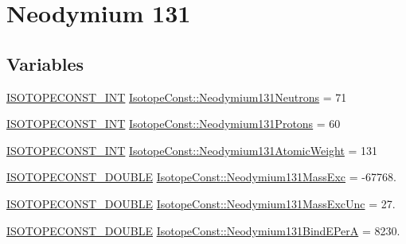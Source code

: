 \hypertarget{group___isotope_const-_neodymium-_nd131}{}\section{Neodymium 131}
\label{group___isotope_const-_neodymium-_nd131}
\subsection*{Variables}
\begin{DoxyCompactItemize}
\item 
\mbox{\hyperlink{group___isotope_const-_macros_ga5f18360b3e99483a35c32d789e62621c}{I\+S\+O\+T\+O\+P\+E\+C\+O\+N\+S\+T\+\_\+\+I\+NT}} \mbox{\hyperlink{group___isotope_const-_neodymium-_nd131_ga7b2fcf7b9120a60a3ad6dd3814edc49d}{Isotope\+Const\+::\+Neodymium131\+Neutrons}} = 71
\item 
\mbox{\hyperlink{group___isotope_const-_macros_ga5f18360b3e99483a35c32d789e62621c}{I\+S\+O\+T\+O\+P\+E\+C\+O\+N\+S\+T\+\_\+\+I\+NT}} \mbox{\hyperlink{group___isotope_const-_neodymium-_nd131_ga1cd483fe2c53ac8040c6fde64a414961}{Isotope\+Const\+::\+Neodymium131\+Protons}} = 60
\item 
\mbox{\hyperlink{group___isotope_const-_macros_ga5f18360b3e99483a35c32d789e62621c}{I\+S\+O\+T\+O\+P\+E\+C\+O\+N\+S\+T\+\_\+\+I\+NT}} \mbox{\hyperlink{group___isotope_const-_neodymium-_nd131_ga61a57539ca4e4c3df9f56d10b41f3926}{Isotope\+Const\+::\+Neodymium131\+Atomic\+Weight}} = 131
\item 
\mbox{\hyperlink{group___isotope_const-_macros_ga8f45a7272ce02c0b4c65c44636ed719a}{I\+S\+O\+T\+O\+P\+E\+C\+O\+N\+S\+T\+\_\+\+D\+O\+U\+B\+LE}} \mbox{\hyperlink{group___isotope_const-_neodymium-_nd131_ga8f1b6b9ac8f3beae7e555125c6402ec9}{Isotope\+Const\+::\+Neodymium131\+Mass\+Exc}} = -\/67768.
\item 
\mbox{\hyperlink{group___isotope_const-_macros_ga8f45a7272ce02c0b4c65c44636ed719a}{I\+S\+O\+T\+O\+P\+E\+C\+O\+N\+S\+T\+\_\+\+D\+O\+U\+B\+LE}} \mbox{\hyperlink{group___isotope_const-_neodymium-_nd131_ga87e343ea5b313340055fa4d89503af5f}{Isotope\+Const\+::\+Neodymium131\+Mass\+Exc\+Unc}} = 27.
\item 
\mbox{\hyperlink{group___isotope_const-_macros_ga8f45a7272ce02c0b4c65c44636ed719a}{I\+S\+O\+T\+O\+P\+E\+C\+O\+N\+S\+T\+\_\+\+D\+O\+U\+B\+LE}} \mbox{\hyperlink{group___isotope_const-_neodymium-_nd131_ga49272cbe855a43cad6c449ecd535e9ef}{Isotope\+Const\+::\+Neodymium131\+Bind\+E\+PerA}} = 8230.
\item 

\end{DoxyCompactItemize}
